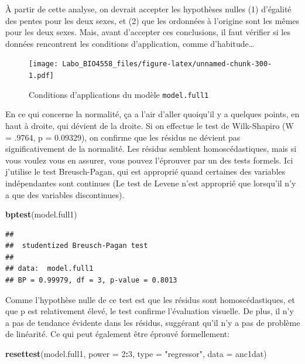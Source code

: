 \documentclass[
  12pt,
]{book}
\newenvironment{Shaded}{\begin{snugshade}}{\end{snugshade}}
\newcommand{\DataTypeTok}[1]{\textcolor[rgb]{0.13,0.29,0.53}{#1}}
\newcommand{\DecValTok}[1]{\textcolor[rgb]{0.00,0.00,0.81}{#1}}
\newcommand{\KeywordTok}[1]{\textcolor[rgb]{0.13,0.29,0.53}{\textbf{#1}}}
\newcommand{\NormalTok}[1]{#1}
\newcommand{\OperatorTok}[1]{\textcolor[rgb]{0.81,0.36,0.00}{\textbf{#1}}}
\newcommand{\StringTok}[1]{\textcolor[rgb]{0.31,0.60,0.02}{#1}}
\begin{document}
À partir de cette analyse, on devrait accepter les hypothèses nulles (1) d'égalité des pentes pour les deux sexes, et (2) que les ordonnées à l'origine sont les mêmes pour les deux sexes. Mais, avant d'accepter ces conclusions, il faut vérifier si les données rencontrent les conditions d'application, comme d'habitude\ldots{}

\begin{figure}
\centering
\texttt{[image: Labo\_BIO4558\_files/figure-latex/unnamed-chunk-300-1.pdf]}
\caption{\label{fig:unnamed-chunk-300}Conditions d'applications du modèle \texttt{model.full1}}
\end{figure}

En ce qui concerne la normalité, ça a l'air d'aller quoiqu'il y a quelques points, en haut à droite, qui dévient de la droite. Si on effectue le test de Wilk-Shapiro (W = .9764, p = 0.09329), on confirme que les résidus ne dévient pas significativement de la normalité. Les résidus semblent homoscédastiques, mais si vous voulez vous en assurer, vous pouvez l'éprouver par un des tests formels. Ici j'utilise le test Breusch-Pagan, qui est approprié quand certaines des variables indépendantes sont continues (Le test de Levene n'est approprié que lorsqu'il n'y a que des variables discontinues).

\begin{Shaded}
\begin{Highlighting}[]
\KeywordTok{bptest}\NormalTok{(model.full1)}
\end{Highlighting}
\end{Shaded}

\begin{verbatim}
## 
##  studentized Breusch-Pagan test
## 
## data:  model.full1
## BP = 0.99979, df = 3, p-value = 0.8013
\end{verbatim}

Comme l'hypothèse nulle de ce test est que les résidus sont homoscédastiques, et que p est relativement élevé, le test confirme l'évaluation visuelle. De plus, il n'y a pas de tendance évidente dans les résidus, suggérant qu'il n'y a pas de problème de linéarité. Ce qui peut également être éprouvé formellement:

\begin{Shaded}
\begin{Highlighting}[]
\KeywordTok{resettest}\NormalTok{(model.full1, }\DataTypeTok{power =} \DecValTok{2}\OperatorTok{:}\DecValTok{3}\NormalTok{, }\DataTypeTok{type =} \StringTok{"regressor"}\NormalTok{, }\DataTypeTok{data =}\NormalTok{ anc1dat)}
\end{Highlighting}
\end{Shaded}
\end{document}

